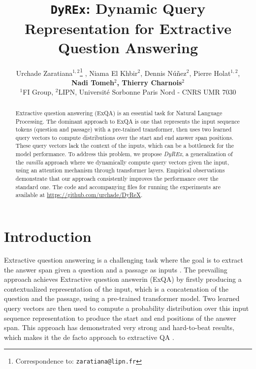 \documentclass{article}
\title{\texttt{DyREx}: Dynamic Query Representation for Extractive Question Answering}
\author{Urchade Zaratiana$^{1,2}$\thanks{Correspondence to: \texttt{zaratiana@lipn.fr}} , Niama El Khbir$^{2}$, Dennis Núñez$^{2}$, Pierre Holat$^{1,2}$, \\ \textbf{Nadi Tomeh$^{2}$, Thierry Charnois$^{2}$} \\
  $^{1}$FI Group, $^{2}$LIPN, Université Sorbonne Paris Nord - CNRS UMR 7030
}
\begin{document}
\maketitle

\renewcommand{\arraystretch}{1.3}

\begin{abstract}
Extractive question answering (ExQA) is an essential task for Natural Language Processing. The dominant approach to ExQA is one that represents the input sequence tokens (question and passage) with a pre-trained transformer, then uses two learned query vectors to compute distributions over the start and end answer span positions. These query vectors lack the context of the inputs, which can be a bottleneck for the model performance. To address this problem, we propose \textit{DyREx}, a generalization of the \textit{vanilla} approach where we dynamically compute query vectors given the input, using an attention mechanism through transformer layers. Empirical observations demonstrate that our approach consistently improves the performance over the standard one. The code and accompanying files for running the experiments are available at \url{https://github.com/urchade/DyReX}.
\end{abstract}

\section{Introduction}

Extractive question answering is a challenging task where the goal is to extract the answer span given a question and a passage as inputs \citep{SQuAD, NaturalQs}. The prevailing approach achieves Extractive question answerin (ExQA) by firstly producing a contextualized representation of the input, which is a concatenation of the question and the passage, using a pre-trained transformer model. Two learned query vectors are then used to compute a probability distribution over this input sequence representation to produce the start and end positions of the answer span.
This approach has demonstrated very strong and hard-to-beat results, which makes it the de facto approach to extractive QA
\citep{BERT, RoBERTa, span_BERT}. 
\end{document}
